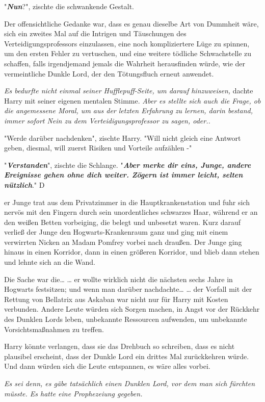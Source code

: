 {"\textbf{\emph{Nun}}?", zischte die schwankende Gestalt.

Der offensichtliche Gedanke war, dass es genau dieselbe Art von Dummheit wäre, sich ein zweites Mal auf die Intrigen und Täuschungen des Verteidigungsprofessors einzulassen, eine noch kompliziertere Lüge zu spinnen, um den ersten Fehler zu vertuschen, und eine weitere tödliche Schwachstelle zu schaffen, falls irgendjemand jemals die Wahrheit herausfinden würde, wie der vermeintliche Dunkle Lord, der den Tötungsfluch erneut anwendet.

\emph{Es bedurfte nicht einmal seiner Hufflepuff-Seite, um darauf hinzuweisen,} dachte Harry mit seiner eigenen mentalen Stimme. \emph{Aber es stellte sich auch die Frage, ob die angemessene Moral, um aus der letzten Erfahrung zu lernen, darin bestand, immer sofort Nein zu dem Verteidigungsprofessor zu sagen, oder..}

"Werde darüber nachdenken", zischte Harry. "Will nicht gleich eine Antwort geben, diesmal, will zuerst Risiken und Vorteile aufzählen -"

"\textbf{\emph{Verstanden}}", zischte die Schlange. "\textbf{\emph{Aber merke dir eins, Junge, andere Ereignisse gehen ohne dich weiter. Zögern ist immer leicht, selten nützlich}}." D

er Junge trat aus dem Privatzimmer in die Hauptkrankenstation und fuhr sich nervös mit den Fingern durch sein unordentliches schwarzes Haar, während er an den weißen Betten vorbeiging, die belegt und unbesetzt waren. Kurz darauf verließ der Junge den Hogwarts-Krankenraum ganz und ging mit einem verwirrten Nicken an Madam Pomfrey vorbei nach draußen. Der Junge ging hinaus in einen Korridor, dann in einen größeren Korridor, und blieb dann stehen und lehnte sich an die Wand.

Die Sache war die… … er wollte wirklich nicht die nächsten sechs Jahre in Hogwarts festsitzen; und wenn man darüber nachdachte… … der Vorfall mit der Rettung von Bellatrix aus Askaban war nicht nur für Harry mit Kosten verbunden. Andere Leute würden sich Sorgen machen, in Angst vor der Rückkehr des Dunklen Lords leben, unbekannte Ressourcen aufwenden, um unbekannte Vorsichtsmaßnahmen zu treffen.

Harry könnte verlangen, dass sie das Drehbuch so schreiben, dass es nicht plausibel erscheint, dass der Dunkle Lord ein drittes Mal zurückkehren würde. Und dann würden sich die Leute entspannen, es wäre alles vorbei.

\emph{Es sei denn, es gäbe tatsächlich einen Dunklen Lord, vor dem man sich fürchten müsste. Es hatte eine Prophezeiung gegeben.}

}
